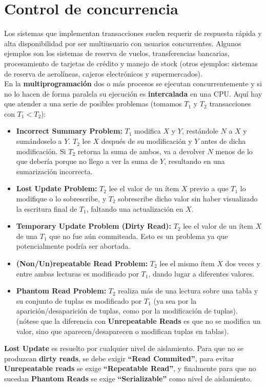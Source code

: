 \section*{Control de concurrencia}
Los sistemas que implementan transacciones suelen requerir de respuesta rápida y alta disponibilidad por ser multiusuario con usuarios concurrentes. Algunos ejemplos son los sistemas de reserva de vuelos, transferencias bancarias, procesamiento de tarjetas de crédito y manejo de stock (otros ejemplos: sistemas de reserva de aerolíneas, cajeros electrónicos y supermercados). \\
En la \textbf{multiprogramación} dos o más procesos se ejecutan concurrentemente y si no lo hacen de forma paralela su ejecución es \textbf{intercalada} en una CPU. Aquí hay que atender a una serie de posibles problemas (tomamos $T_1$ y $T_2$ transacciones con $T_1 < T_2$):
\begin{itemize}
    \item \textbf{Incorrect Summary Problem:} $T_1$ modifica $X$ y $Y$, restándole $N$ a $X$ y sumándoselo a $Y$. $T_2$ lee $X$ después de su modificación y $Y$ antes de dicha modificación. Si $T_2$ retorna la suma de ambos, va a devolver $N$ menos de lo que debería porque no llego a ver la suma de $Y$, resultando en una sumarización incorrecta.
    \item \textbf{Lost Update Problem:} $T_2$ lee el valor de un ítem $X$ previo a que $T_1$ lo modifique o lo sobrescribe, y $T_2$ sobrescribe dicho valor sin haber visualizado la escritura final de $T_1$, faltando una actualización en $X$.
    \item \textbf{Temporary Update Problem (Dirty Read):} $T_2$ lee el valor de un ítem $X$ de una $T_1$ que no fue aún commiteada. Esto es un problema ya que potencialmente podría ser abortada.
    \item \textbf{(Non/Un)repeatable Read Problem:} $T_2$ lee el mismo ítem $X$ dos veces y entre ambas lecturas es modificado por $T_1$, dando lugar a diferentes valores.
    \item \textbf{Phantom Read Problem:} $T_2$ realiza más de una lectura sobre una tabla y su conjunto de tuplas es modificado por $T_1$ (ya sea por la aparición/desaparición de tuplas, como por la modificación de tuplas). (nótese que la diferencia con \textbf{Unrepeatable Reads} es que no se modifica un valor, sino que aparecen/desaparecen o modifican tuplas en tablas). 
\end{itemize}


\textbf{Lost Update} es resuelto por cualquier nivel de aislamiento. Para que no se produzcan \textbf{dirty reads}, se debe exigir \textbf{``Read Commited''}, para evitar \textbf{Unrepeatable reads} se exige \textbf{``Repeatable Read''}, y finalmente para que no sucedan \textbf{Phantom Reads} se exige \textbf{``Serializable''} como nivel de aislamiento. 


